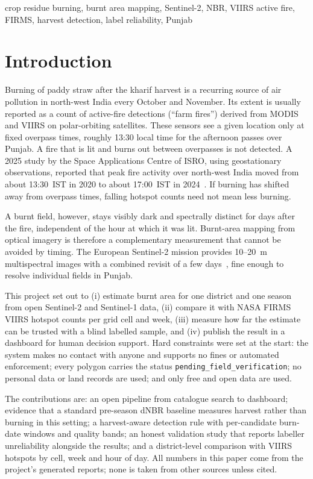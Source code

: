\documentclass[conference]{IEEEtran}
\begin{document}
\begin{IEEEkeywords}
crop residue burning, burnt area mapping, Sentinel-2, NBR, VIIRS active fire, FIRMS, harvest
detection, label reliability, Punjab
\end{IEEEkeywords}

\section{Introduction}
Burning of paddy straw after the kharif harvest is a recurring source of air pollution in
north-west India every October and November. Its extent is usually reported as a count of
active-fire detections (``farm fires'') derived from MODIS and VIIRS on polar-orbiting
satellites. These sensors see a given location only at fixed overpass times, roughly 13:30 local
time for the afternoon passes over Punjab. A fire that is lit and burns out between overpasses
is not detected. A 2025 study by the Space Applications Centre of ISRO, using geostationary
observations, reported that peak fire activity over north-west India moved from about 13:30~IST
in 2020 to about 17:00~IST in 2024~\cite{singh2025}. If burning has shifted away from overpass
times, falling hotspot counts need not mean less burning.

A burnt field, however, stays visibly dark and spectrally distinct for days after the fire,
independent of the hour at which it was lit. Burnt-area mapping from optical imagery is therefore
a complementary measurement that cannot be avoided by timing. The European Sentinel-2 mission
provides 10--20~m multispectral images with a combined revisit of a few days~\cite{drusch2012},
fine enough to resolve individual fields in Punjab.

This project set out to (i) estimate burnt area for one district and one season from open
Sentinel-2 and Sentinel-1 data, (ii) compare it with NASA FIRMS VIIRS hotspot counts per grid cell
and week, (iii) measure how far the estimate can be trusted with a blind labelled sample, and
(iv) publish the result in a dashboard for human decision support. Hard constraints were set at
the start: the system makes no contact with anyone and supports no fines or automated
enforcement; every polygon carries the status \texttt{pending\_field\_verification}; no personal
data or land records are used; and only free and open data are used.

The contributions are: an open pipeline from catalogue search to dashboard; evidence that a
standard pre-season dNBR baseline measures harvest rather than burning in this setting; a
harvest-aware detection rule with per-candidate burn-date windows and quality bands; an honest
validation study that reports labeller unreliability alongside the results; and a district-level
comparison with VIIRS hotspots by cell, week and hour of day. All numbers in this paper come from
the project's generated reports; none is taken from other sources unless cited.
\end{document}
